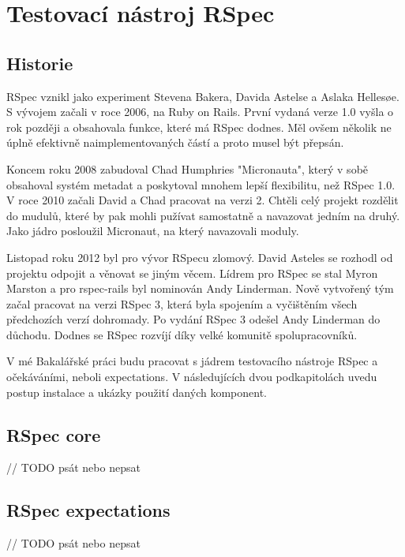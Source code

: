 \section {Testovací nástroj RSpec}
\subsection{Historie}
\par RSpec vznikl jako experiment Stevena Bakera, Davida Astelse a Aslaka Hellesøe. S vývojem začali v roce 2006, na Ruby on Rails. První vydaná verze 1.0 vyšla o rok později a obsahovala funkce, které má RSpec dodnes. Měl ovšem několik ne úplně efektivně naimplementovaných částí a proto musel být přepsán.
\par Koncem roku 2008 zabudoval Chad Humphries "Micronauta", který v sobě obsahoval systém metadat a poskytoval mnohem lepší flexibilitu, než RSpec 1.0. V roce 2010 začali David a Chad pracovat na verzi 2. Chtěli celý projekt rozdělit do mudulů, které by pak mohli pužívat samostatně a navazovat jedním na druhý. Jako jádro posloužil Micronaut, na který navazovali moduly.
\par Listopad roku 2012 byl pro vývor RSpecu zlomový. David Asteles se rozhodl od projektu odpojit a věnovat se jiným věcem. Lídrem pro RSpec se stal Myron Marston a pro rspec-rails byl nominován Andy Linderman. Nově vytvořený tým začal pracovat na verzi RSpec 3, která byla spojením a vyčištěním všech předchozích verzí dohromady. Po vydání RSpec 3 odešel Andy Linderman do důchodu. Dodnes se RSpec rozvíjí díky velké komunitě spolupracovníků.
\par V mé Bakalářské práci budu pracovat s jádrem testovacího nástroje RSpec a očekáváními, neboli expectations. V následujících dvou podkapitolách uvedu postup instalace a ukázky použití daných komponent.

\subsection{RSpec core}
// TODO psát nebo nepsat

\subsection{RSpec expectations}
// TODO psát nebo nepsat
